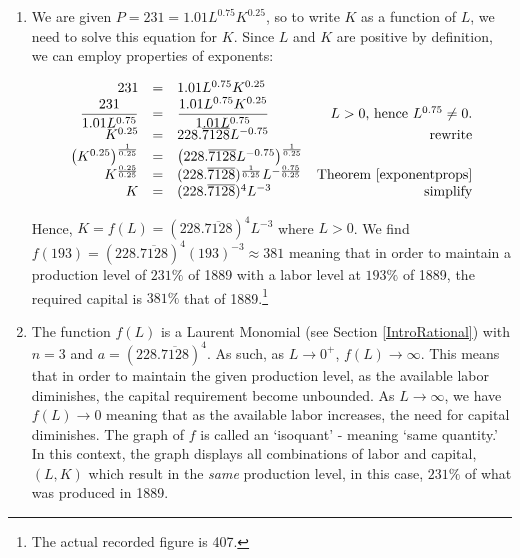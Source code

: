 \documentclass{ximera}
\begin{document}
\begin{ex}
\begin{enumerate}
\item We are given $P = 231 = 1.01L^{0.75} K^{0.25}$, so to write $K$ as a function of $L$, we need to solve this equation for $K$.  Since $L$ and $K$ are positive by definition, we can employ properties of exponents:

\[ \begin{array}{rclr}

231 & = & 1.01 L^{0.75} K^{0.25} & \\

\dfrac{231}{1.01 L^{0.75}} & = &  \dfrac{1.01 L^{0.75} K^{0.25}}{1.01 L^{0.75}} & \text{$L>0$, hence $L^{0.75} \neq 0$.}\\

K^{0.25} & = & 228.\overline{7128}L^{-0.75} & \text{rewrite} \\

\left(K^{0.25}\right)^{\frac{1}{0.25}} & = & \left(228.\overline{7128}L^{-0.75}\right)^{\frac{1}{0.25}} & \\

K^{\frac{0.25}{0.25}} & = & (228.\overline{7128})^{\frac{1}{0.25}} L^{-\frac{0.75}{0.25}} & \text{Theorem  \ref{exponentprops}} \\

K & = &  (228.\overline{7128})^{4} L^{-3} & \text{simplify} \\ \end{array} \]

Hence, $K = f(L) =  (228.\overline{7128})^{4} L^{-3}$ where $L>0$.  We find $f(193) =  (228.\overline{7128})^{4} (193)^{-3} \approx 381$ meaning that in order to maintain a production level of $231 \%$ of 1889 with a labor level at $193 \%$ of 1889, the required capital is $381 \%$ that of 1889.\footnote{The actual recorded figure is 407.}

\item The function $f(L)$ is a Laurent Monomial (see Section \ref{IntroRational}) with $n = 3$ and $a = (228.\overline{7128})^{4}$.  As such, as $L \rightarrow 0^{+}$, $f(L) \rightarrow \infty$.  This means that in order to maintain the given production level, as the available labor diminishes, the capital requirement become unbounded.  As $L \rightarrow \infty$, we have $f(L) \rightarrow 0$ meaning that as the available labor increases, the need for capital diminishes.  The graph of $f$ is called an `isoquant' - meaning `same quantity.'  In this context, the graph displays all combinations of labor and capital, $(L,K)$  which result in the \textit{same} production level, in this case, $231 \%$ of what was produced in 1889.


\end{enumerate}
\end{ex}
\end{document}
